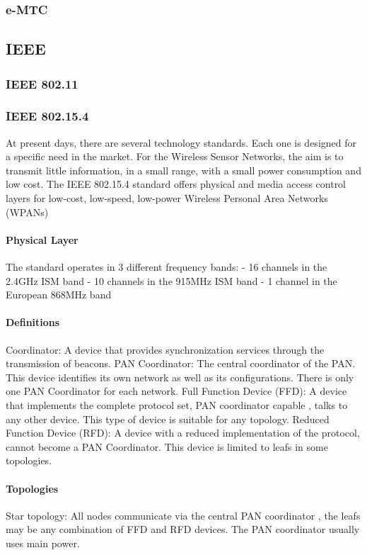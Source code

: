 \subsubsection{e-MTC}


\subsection{IEEE}
\subsubsection{IEEE 802.11}



\subsubsection{IEEE 802.15.4}
At present days,
	there are several technology standards.
Each one is designed for a specific need in the market.
For the Wireless Sensor Networks,
	the aim is to transmit little information,
	in a small range,
	with a small power consumption and low cost.
The IEEE 802.15.4 standard offers physical and media access control layers for low-cost,
	low-speed,
	low-power Wireless Personal Area Networks (WPANs)

\paragraph{Physical Layer}
The standard operates in 3 different frequency bands:
- 16 channels in the 2.4GHz ISM band
- 10 channels in the 915MHz ISM band
- 1 channel in the European 868MHz band


\paragraph{Definitions}
Coordinator:
	A device that provides synchronization services through the transmission of beacons.
PAN Coordinator:
	The central coordinator of the PAN.
This device identifies its own network as well as its configurations.
There is only one PAN Coordinator for each network.
Full Function Device (FFD):
	A device that implements the complete protocol set,
	PAN coordinator capable ,
	talks to any other device.
This type of device is suitable for any topology.
Reduced Function Device (RFD):
	A device with a reduced implementation of the protocol,
	cannot become a PAN Coordinator.
This device is limited to leafs in some topologies.

\paragraph{Topologies}
Star topology:
	All nodes communicate via the central PAN coordinator ,
	the leafs may be any combination of FFD and RFD devices.
The PAN coordinator usually uses main power.

